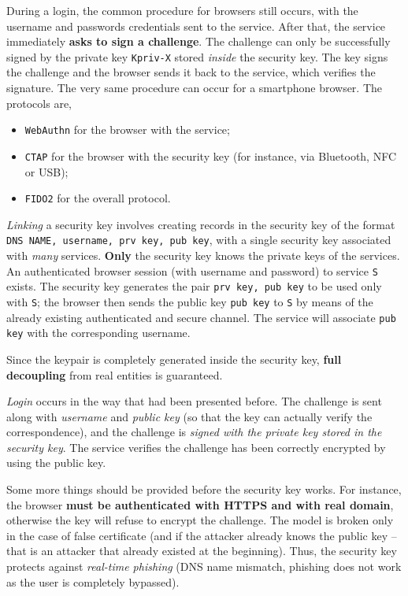 \documentclass[10pt]{extbook}
\begin{document}
During a login, the common procedure for browsers still occurs, with the
username and passwords credentials sent to the service. After that, the service
immediately \textbf{asks to sign a challenge}. The challenge can only be
successfully signed by the private key \texttt{Kpriv-X} stored \emph{inside}
the security key. The key signs the challenge and the browser sends it back to
the service, which verifies the signature. The very same procedure can occur
for a smartphone browser. The protocols are, 
\begin{itemize}
    \item \texttt{WebAuthn} for the browser with the service;
    \item \texttt{CTAP} for the browser with the security key (for instance,
        via Bluetooth, NFC or USB);
    \item \texttt{FIDO2} for the overall protocol.
\end{itemize}

\emph{Linking} a security key involves creating records in the security key of
the format \texttt{DNS NAME, username, prv key, pub key}, with a single
security key associated with \emph{many} services. \textbf{Only} the security
key knows the private keys of the services. An authenticated browser session
(with username and password) to service \texttt{S} exists. The security key
generates the pair \texttt{prv key, pub key} to be used only with \texttt{S};
the browser then sends the public key \texttt{pub key} to \texttt{S} by means
of the already existing authenticated and secure channel. The service will
associate \texttt{pub key} with the corresponding username.

Since the keypair is completely generated inside the security key, \textbf{full
decoupling} from real entities is guaranteed.

\emph{Login} occurs in the way that had been presented before. The challenge is
sent along with \emph{username} and \emph{public key} (so that the key can
actually verify the correspondence), and the challenge is \emph{signed with the
private key stored in the security key}. The service verifies the challenge has
been correctly encrypted by using the public key.

Some more things should be provided before the security key works. For
instance, the browser \textbf{must be authenticated with HTTPS and with real
domain}, otherwise the key will refuse to encrypt the challenge. The model is
broken only in the case of false certificate (and if the attacker already knows
the public key -- that is an attacker that already existed at the beginning).
Thus, the security key protects against \emph{real\--time phishing} (DNS name
mismatch, phishing does not work as the user is completely bypassed).
\end{document}
